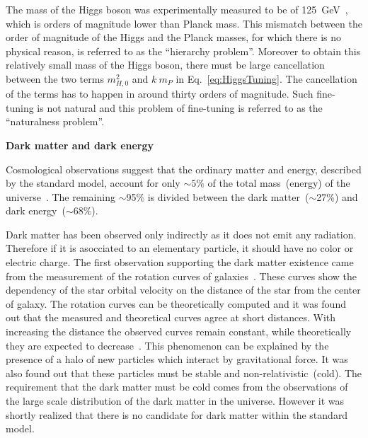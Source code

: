 The mass of the Higgs boson was experimentally measured to be of 125~GeV~\cite{Chatrchyan:2012xdj, Aad:2012tfa}, which is orders of magnitude lower than Planck mass. This mismatch between the order of magnitude of the Higgs and the Planck masses, for which there is no physical reason, is referred to as the ``hierarchy problem''. Moreover to obtain this relatively small mass of the Higgs boson, there must be large cancellation between the two terms $m_{H, 0}^{2}$ and $k ~m_{P}$  in Eq.~\ref{eq:HiggsTuning}. The cancellation of the terms has to happen in around thirty orders of magnitude. Such fine-tuning is not natural and this problem of fine-tuning is referred to as the ``naturalness problem''.


\textbf{Dark matter and dark energy}

Cosmological observations suggest that the ordinary matter and energy, described by the standard model, account for only $\sim 5\%$ of the total mass~(energy) of the universe~\cite{Bertone:2004pz, Bennett:2012zja}. The remaining $\sim$95\% is divided between the dark matter~($\sim$27\%) and dark energy~($\sim$68\%).

Dark matter has been observed only indirectly as it does not emit any radiation. Therefore if it is asocciated to an elementary particle, it should have no color or electric charge. The first observation supporting the dark matter existence came from the measurement of the rotation curves of galaxies~\cite{Zwicky:1937zza, Rubin:1980zd}. These curves show the dependency of the star orbital velocity on the distance of the star from the center of galaxy. The rotation curves can be theoretically computed and it was found out that the measured and theoretical curves agree at short distances. With increasing the distance the observed curves remain constant, while theoretically they are expected to decrease~\cite{Bertone:2004pz}. This phenomenon can be explained by the presence of a halo of new particles which interact by gravitational force. It was also found out that these particles must be stable and non-relativistic~(cold). The requirement that the dark matter must be cold comes from the observations of the large scale distribution of the dark matter in the universe. However it was shortly realized that there is no candidate for dark matter within the standard model.

